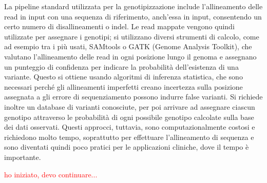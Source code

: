 \documentclass[../main.tex]{subfiles}
\begin{document}
La pipeline standard utilizzata per la genotipizzazione include l'allineamento delle read in input con una sequenza di riferimento, anch'essa in input, consentendo un certo numero di disallineamenti o indel. Le read mappate vengono quindi utilizzate per assegnare i genotipi; si utilizzano diversi strumenti di calcolo, come ad esempio tra i più usati, SAMtools o GATK (Genome Analysis Toolkit), che valutano l'allineamento delle read in ogni posizione lungo il genoma e assegnano un punteggio di confidenza per indicare la probabilità dell'esistenza di una variante. Questo si ottiene usando algoritmi di inferenza statistica, che sono necessari perché gli allineamenti imperfetti creano incertezza sulla posizione assegnata a gli errore di sequenziamento possono indurre false varianti. Si richiede inoltre un database di varianti conosciute, per poi arrivare ad assegnare ciascun genotipo attraverso le probabilità di ogni possibile genotipo calcolate sulla base dei dati osservati. Questi approcci, tuttavia, sono computazionalmente costosi e richiedono molto tempo, soprattutto per effettuare l'allineamento di sequenza e sono diventati quindi poco pratici per le applicazioni cliniche, dove il tempo è importante. 


\textcolor{red}{ho iniziato, devo continuare...}
\end{document}
